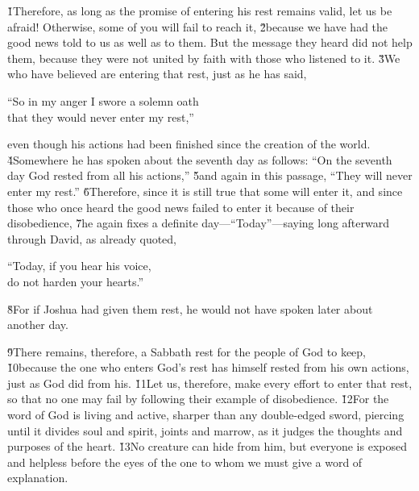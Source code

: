 \v{1}Therefore, as long as the promise of entering his rest remains valid, let us be afraid! Otherwise, some of you will fail to reach it, \v{2}because we have had the good news told to us as well as to them. But the message they heard did not help them, because they were not united by faith with those who listened to it. \v{3}We who have believed are entering that rest, just as he has said,

\begin{poetry}
\poeml ``So in my anger I swore a solemn oath \\
\poemll    that they would never enter my rest,''
\end{poetry}

even though his actions had been finished since the creation of the world. \v{4}Somewhere he has spoken about the seventh day as follows: ``On the seventh day God rested from all his actions,'' \v{5}and again in this passage, ``They will never enter my rest.'' \v{6}Therefore, since it is still true that some will enter it, and since those who once heard the good news failed to enter it because of their disobedience, \v{7}he again fixes a definite day---``Today''---saying long afterward through David, as already quoted,

\begin{poetry}
\poeml ``Today, if you hear his voice, \\
\poemll    do not harden your hearts.''
\end{poetry}

\v{8}For if Joshua had given them rest, he would not have spoken later about another day.

\v{9}There remains, therefore, a Sabbath rest for the people of God to keep, \v{10}because the one who enters God's rest has himself rested from his own actions, just as God did from his. \v{11}Let us, therefore, make every effort to enter that rest, so that no one may fail by following their example of disobedience. \v{12}For the word of God is living and active, sharper than any double-edged sword, piercing until it divides soul and spirit, joints and marrow, as it judges the thoughts and purposes of the heart. \v{13}No creature can hide from him, but everyone is exposed and helpless before the eyes of the one to whom we must give a word of explanation.

